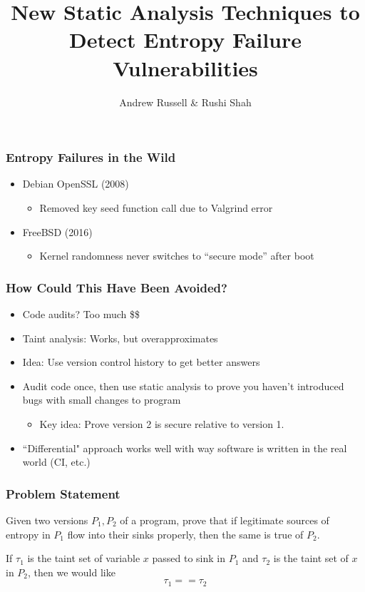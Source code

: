 \documentclass{beamer} %
\title{New Static Analysis Techniques to Detect Entropy Failure Vulnerabilities}
\author{Andrew Russell \& Rushi Shah}
\institute{The University of Texas at Austin}
\theoremstyle{definition} %
\begin{document}
\begin{frame}
\titlepage
\end{frame}

\begin{frame}
\frametitle{Entropy Failures in the Wild}
     \begin{itemize} 
        \item Debian OpenSSL (2008)
        \begin{itemize}
            \item Removed key seed function call due to Valgrind error
        \end{itemize}

        \pause

        \item FreeBSD (2016)
        \begin{itemize}
            \item Kernel randomness never switches to ``secure mode'' after boot
       \end{itemize}
	 \end{itemize}
\end{frame}

\begin{frame}
\frametitle{How Could This Have Been Avoided?}
\begin{itemize}
    \item Code audits? Too much \$\$
    \item Taint analysis: Works, but overapproximates
    \item Idea: Use version control history to get better answers
    \item Audit code once, then use static analysis to prove you haven't introduced bugs with small changes to program
    \begin{itemize}
        \item Key idea: Prove version 2 is secure relative to version 1.
    \end{itemize}

	\item ``Differential" approach works well with way software is written in the real world (CI, etc.)
\end{itemize}
\end{frame}

\begin{frame}
\frametitle{Problem Statement}

	Given two versions $P_1, P_2$ of a program, prove that if legitimate sources of entropy in $P_1$ flow into their sinks properly, then the same is true of $P_2$. 

	If $\tau_1$ is the taint set of variable $x$ passed to sink in $P_1$ and $\tau_2$ is the taint set of $x$ in $P_2$, then we would like \[\tau_1 == \tau_2\]
	


\end{frame}
\end{document}
